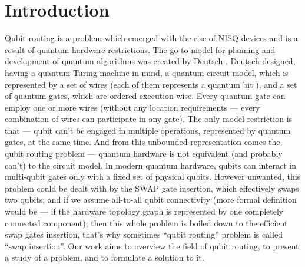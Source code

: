 \newcommand{\package}{\emph}

\chapter{Introduction}

Qubit routing is a problem which emerged with the rise of NISQ devices and is a result of quantum hardware restrictions. The go-to model for planning and development of quantum algorithms was created by Deutsch \cite{deutschQuantumComputationalNetworks1989}. Deutsch designed, having a quantum Turing machine in mind, a quantum circuit model, which is represented by a set of wires (each of them represents a quantum bit ), and a set of quantum gates, which are ordered execution-wise. Every quantum gate can employ one or more wires (without any location requirements — every combination of wires can participate in any gate). The only model restriction is that — qubit can’t be engaged in multiple operations, represented by quantum gates, at the same time. And from this unbounded representation comes the qubit routing problem — quantum hardware is not equivalent (and probably can’t) to the circuit model. In modern quantum hardware, qubits can interact in multi-qubit gates only with a fixed set of physical qubits. However unwanted, this problem could be dealt with by the SWAP gate insertion, which effectively swaps two qubits; and if we assume all-to-all qubit connectivity (more formal definition would be — if the hardware topology graph is represented by one completely connected component), then this whole problem is boiled down to the efficient swap gates insertion, that’s why sometimes “qubit routing” problem is called “swap insertion”. Our work aims to overview the field of qubit routing, to present a study of a problem, and to formulate a solution to it.
